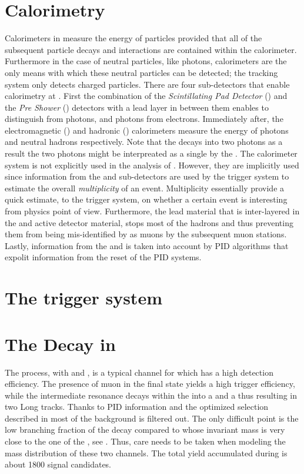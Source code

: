 \section{Calorimetry}
\label{det_calo}
Calorimeters in \lhcb measure the energy of particles provided that all of the subsequent particle decays
and interactions are contained within the calorimeter. Furthermore in the case of neutral particles, like photons,
calorimeters are the only means with which these neutral particles can be detected; the tracking system
only detects charged particles. There are four sub-detectors that enable calorimetry at \lhcb.
First the combination of the {\it Scintillating Pad Detector} (\spd)
and the {\it Pre Shower} (\presh) detectors with a lead layer in between them enables to distinguish \piz from
photons, and photons from electrons. Immediately after, the electromagnetic (\ecal) and hadronic (\hcal)
calorimeters measure the energy of photons and neutral hadrons respectively.
Note that the \piz decays into two photons as a result the two photons might be interpreated as a single by the \ecal.
The calorimeter system is not explicitly used in the analysis of .
However, they are implicitly used since information from the \spd and \presh sub-detectors are used
by the \lzero trigger system to estimate the overall {\it multiplicity} of an event. Multiplicity essentially
provide a quick estimate, to the \lzero trigger system, on whether a certain event is interesting from physics
point of view. Furthermore, the lead material that is inter-layered in the \ecal and \hcal active detector material,
stops most of the hadrons and thus preventing them from being mis-identified by as muons by the subsequent muon stations.
Lastly, information from the \ecal and \hcal is taken into account by PID algorithms that expolit information from
the reset of the PID systems.

\section{The trigger system}
\label{det_trigger}


\section{The \BsJpsiKst Decay in \lhcb}
\label{BspsiKst_at_lhcb}


The \BsJpsiKst process, with \Jpsimumu and \KstKpi, is a typical channel for which \lhcb has a high detection efficiency.
The presence of muon in the final state yields a high trigger efficiency, while the intermediate
\Kstarz resonance decays within the \velo into a \Kp and a \pim thus resulting in two Long tracks.
Thanks to PID information and the optimized selection described in  most of the background
is filtered out. The only difficult point is the low branching fraction of the \BsJpsiKst decay
compared to \BdJpsiKst whose invariant mass is very close to the one of the \BsJpsiKst, see .
Thus, care needs to be taken when modeling the mass distribution of these two channels.
The total \BsJpsiKst yield accumulated during \runone is about 1800 signal candidates.

